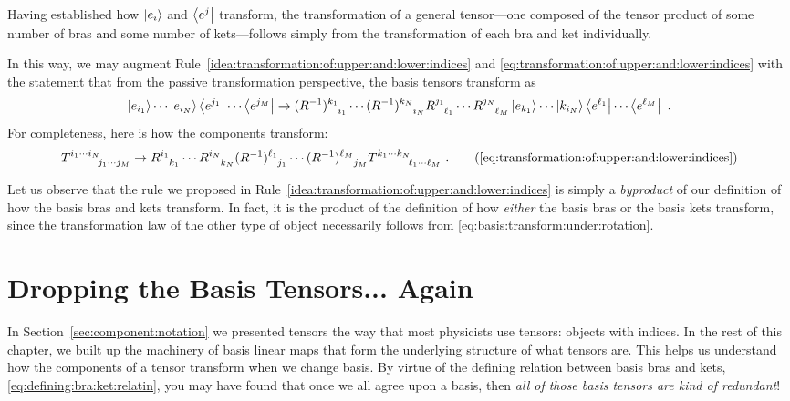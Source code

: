 \documentclass[12pt, oneside]{report}    %
\newenvironment{wide}{\begin{adjustwidth}{0cm}{-6.25cm}}{\end{adjustwidth}}
\let\oldsection\section
\def\section{%
  \setcounter{sidenote}{1}%
  \oldsection
}
\begin{document}
Having established how $\left|e_i\right\rangle$ and $\left\langle e^j\right|$ transform, the transformation of a general tensor---one composed of the tensor product of some number of bras and some number of kets---follows simply from the transformation of each bra and ket individually.

\begin{wide}
In this way, we may augment Rule~\ref{idea:transformation:of:upper:and:lower:indices} and \eqref{eq:transformation:of:upper:and:lower:indices} with the statement that from the passive transformation perspective, the basis tensors transform as
\begin{align}
    \ket{e_{i_1}} \cdots \ket{e_{i_N}}
    \bra{e^{j_1}} \cdots \bra{e^{j_M}}
    \to 
    (R\inv)\aij{k_1}{i_1}\cdots (R\inv)\aij{k_N}{i_N}
    R\aij{j_1}{\ell_1}\cdots R\aij{j_N}{\ell_M}
    \ket{e_{k_1}} \cdots \ket{k_{i_N}}
    \bra{e^{\ell_1}} \cdots \bra{e^{\ell_M}} \ .
\end{align}
For completeness, here is how the components transform:
\begin{align}
    T\aij{i_1\cdots i_N}{j_1\cdots j_M}
    \to 
    R\aij{i_1}{k_1}\cdots R\aij{i_N}{k_N}
    (R\inv)\aij{\ell_1}{j_1}\cdots (R\inv)\aij{\ell_M}{j_M}
    T\aij{k_1\cdots k_N}{\ell_1\cdots \ell_M} \ .
    \tag{\ref{eq:transformation:of:upper:and:lower:indices}}
\end{align}
\end{wide}

Let us observe that the rule we proposed in Rule~\ref{idea:transformation:of:upper:and:lower:indices} is simply a \emph{byproduct} of our definition of how the basis bras and kets transform. In fact, it is the product of the definition of how \emph{either} the basis bras or the basis kets transform, since the transformation law of the other type of object necessarily follows from \eqref{eq:basis:transform:under:rotation}.

\section{Dropping the Basis Tensors... Again}

In Section~\ref{sec:component:notation} we presented tensors the way that most physicists use tensors: objects with indices. In the rest of this chapter, we built up the machinery of basis linear maps that form the underlying structure of what tensors are. This helps us understand how the components of a tensor transform when we change basis. By virtue of the defining relation between basis bras and kets, \eqref{eq:defining:bra:ket:relatin}, you may have found that once we all agree upon a basis, then \emph{all of those basis tensors are kind of redundant}!
\end{document}
